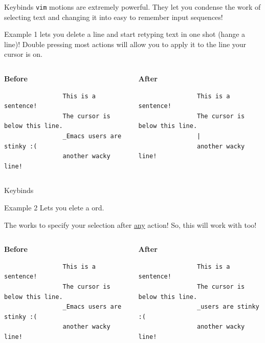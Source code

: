 \documentclass{beamer}
\begin{document}
\begin{frame}[fragile]{Keybinds}
	\texttt{vim} motions are extremely powerful. They let you condense the
	work of selecting text and changing it into easy to remember input
	sequences!
	\pause

	\begin{exampleblock}{Example 1}
		 lets you delete a line and start retyping text in one
		shot (hange a line)! Double pressing most actions will
		allow you to apply it to the line your cursor is on.
		\pause

		\bigskip

		\begin{columns}
			\begin{column}{0.5\textwidth}
				\textbf{Before}
				\begin{verbatim}
				This is a sentence!
				The cursor is below this line.
				_Emacs users are stinky :(
				another wacky line!
				\end{verbatim}
			\end{column}
			\begin{column}{0.5\textwidth}
				\textbf{After}
				\begin{verbatim}
				This is a sentence!
				The cursor is below this line.
				|
				another wacky line!
				\end{verbatim}
			\end{column}
		\end{columns}
	\end{exampleblock}
\end{frame}

\begin{frame}[fragile]{Keybinds}
	\begin{exampleblock}{Example 2}
		 Lets you elete a \keys{w}ord.
		\pause

		The  works to specify your selection after
		\underline{any} action! So, this will work with  too!
		\pause

		\medskip

		\begin{columns}
			\begin{column}{0.5\textwidth}
				\textbf{Before}
				\begin{verbatim}
				This is a sentence!
				The cursor is below this line.
				_Emacs users are stinky :(
				another wacky line!
				\end{verbatim}
			\end{column}
			\begin{column}{0.5\textwidth}
				\textbf{After}
				\begin{verbatim}
				This is a sentence!
				The cursor is below this line.
				_users are stinky :(
				another wacky line!
				\end{verbatim}
			\end{column}
		\end{columns}
	\end{exampleblock}
\end{frame}
\end{document}
